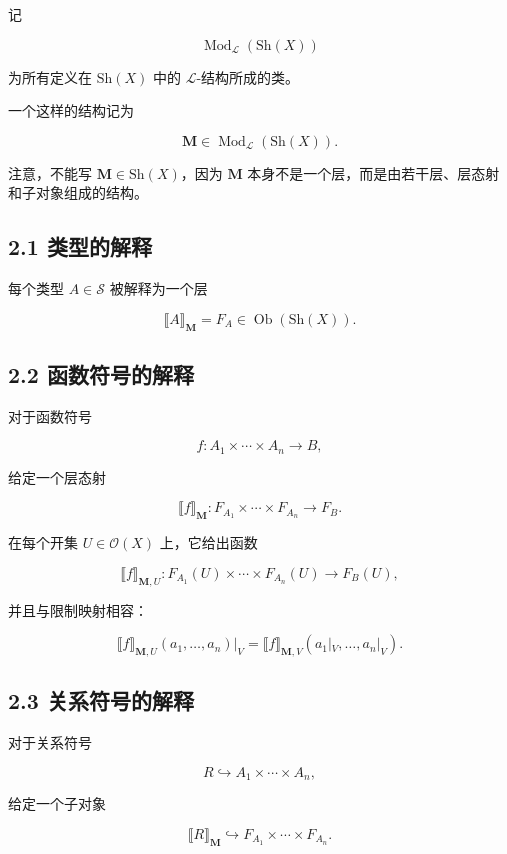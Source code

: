 \documentclass{ctexart}
\begin{document}
记

\[
\operatorname{Mod}_{\mathcal L}(\mathrm{Sh}(X))
\]

为所有定义在 $\mathrm{Sh}(X)$ 中的 $\mathcal L$-结构所成的类。

一个这样的结构记为

\[
\mathbf M\in
\operatorname{Mod}_{\mathcal L}(\mathrm{Sh}(X)).
\]

注意，不能写 $\mathbf M\in\mathrm{Sh}(X)$，因为 $\mathbf M$ 本身不是一个层，而是由若干层、层态射和子对象组成的结构。

\subsection*{2.1 类型的解释}

每个类型 $A\in\mathcal S$ 被解释为一个层

\[
\llbracket A\rrbracket_{\mathbf M}=F_A
\in\operatorname{Ob}(\mathrm{Sh}(X)).
\]

\subsection*{2.2 函数符号的解释}

对于函数符号

\[
f:A_1\times\cdots\times A_n\to B,
\]

给定一个层态射

\[
\llbracket f\rrbracket_{\mathbf M}:
F_{A_1}\times\cdots\times F_{A_n}
\longrightarrow F_B.
\]

在每个开集 $U\in\mathcal O(X)$ 上，它给出函数

\[
\llbracket f\rrbracket_{\mathbf M,U}:
F_{A_1}(U)\times\cdots\times F_{A_n}(U)
\longrightarrow F_B(U),
\]

并且与限制映射相容：

\[
\llbracket f\rrbracket_{\mathbf M,U}(a_1,\ldots,a_n)|_V
=
\llbracket f\rrbracket_{\mathbf M,V}
(a_1|_V,\ldots,a_n|_V).
\]

\subsection*{2.3 关系符号的解释}

对于关系符号

\[
R\hookrightarrow A_1\times\cdots\times A_n,
\]

给定一个子对象

\[
\llbracket R\rrbracket_{\mathbf M}
\hookrightarrow
F_{A_1}\times\cdots\times F_{A_n}.
\]
\end{document}
